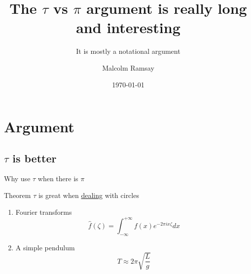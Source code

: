 \documentclass[aspectratio=169, 22pt]{beamer}
\title{The $\tau$ vs $\pi$ argument is really long and interesting}
\subtitle{It is mostly a notational argument}
\date{\today}
\author[Malcolm]{Malcolm Ramsay}
\begin{document}
\begin{frame}
  \titlepage{}
\end{frame}

\section{Argument}
\subsection{$\tau$ is better}

\begin{frame}{Why use $\tau$ when there is $\pi$}
  \begin{block}{Theorem}
    $\tau$ is great when \href{http://blah}{dealing} with circles
  \end{block}

  \begin{enumerate}
    \item<1-> Fourier transforms
      \begin{equation}
        \hat f(\zeta) = \int_{-\infty}^{+\infty} f(x) e^{-2\pi ix\zeta} dx
      \end{equation}
    \item<2-> A simple pendulum
      \begin{equation}
        T \approx 2\pi \sqrt{\frac{L}{g}}
      \end{equation}
  \end{enumerate}
\end{frame}
\end{document}
